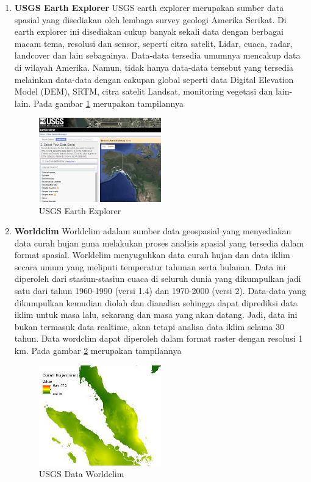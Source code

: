 \begin{enumerate}
\item \textbf{USGS Earth Explorer}
\subitem USGS earth explorer merupakan sumber data spasial yang disediakan oleh lembaga survey geologi Amerika Serikat. Di earth explorer ini disediakan cukup banyak sekali data dengan berbagai macam tema, resolusi dan sensor, seperti citra satelit, Lidar, cuaca, radar, landcover dan lain sebagainya. Data-data tersedia umumnya mencakup data di wilayah Amerika. Namun, tidak hanya data-data tersebut yang tersedia melainkan data-data dengan cakupan global seperti data Digital Elevation Model (DEM), SRTM, citra satelit Landsat, monitoring vegetasi dan lain-lain.  Pada gambar \ref{labelgambar2} merupakan tampilannya  
\begin{figure}[ht]
\centering
\includegraphics[width=0.5\textwidth]{pictures/usgs_earth_explorer}
\caption{USGS Earth Explorer}
\label{labelgambar2}
\end{figure}

\item \textbf{Worldclim}
\subitem Worldclim adalam sumber data geospasial yang menyediakan data curah hujan guna melakukan proses analisis spasial yang tersedia dalam format spasial. Worldclim menyuguhkan data curah hujan dan data iklim secara umum yang meliputi temperatur tahunan serta bulanan. Data ini diperoleh dari stasiun-stasiun cuaca di seluruh dunia yang dikumpulkan jadi satu dari tahun 1960-1990 (versi 1.4) dan 1970-2000 (versi 2). Data-data yang dikumpulkan kemudian diolah dan dianalisa sehingga dapat diprediksi data iklim untuk masa lalu, sekarang dan masa yang akan datang. Jadi, data ini bukan termasuk data realtime, akan tetapi analisa data iklim selama 30 tahun. Data wordclim dapat diperoleh dalam format raster dengan resolusi 1 km.  Pada gambar \ref{labelgambar3} merupakan tampilannya  

\begin{figure}[ht]
\centering
\includegraphics[width=0.5\textwidth]{pictures/data_worldclim}
\caption{USGS Data Worldclim}
\label{labelgambar3}
\end{figure}


\end{enumerate}
